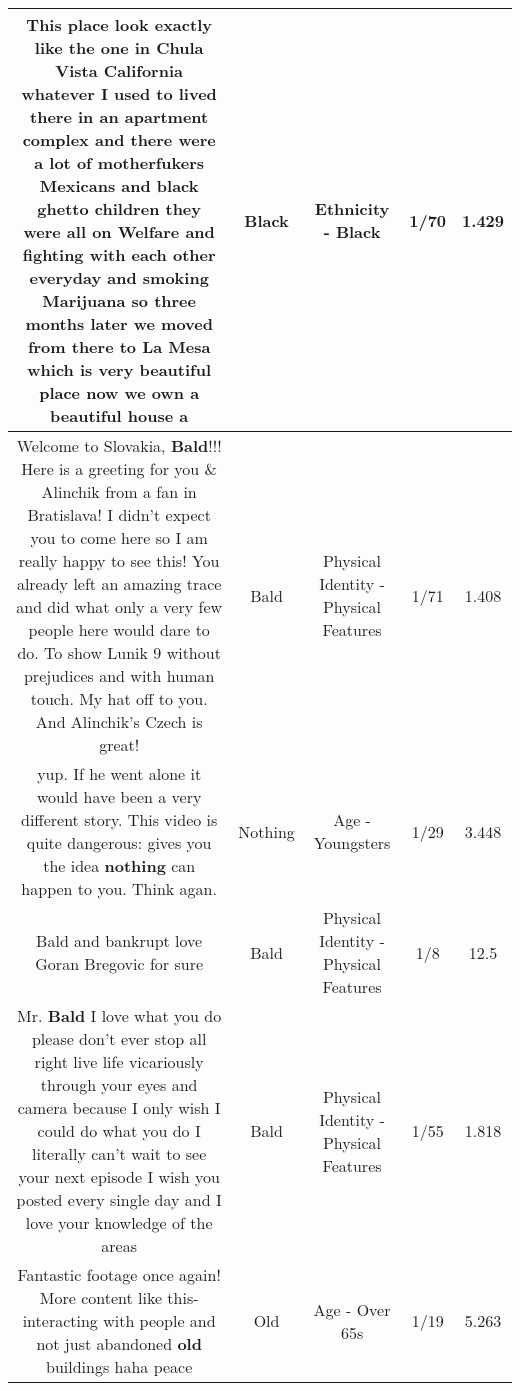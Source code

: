 \documentclass[11pt]{article}
\newlength\mylength
\begin{document}
\begin{center}
\begin{longtable}{|C{.65\mylength}|C{.30\mylength}|C{.12\mylength}|C{.12\mylength}|C{.12\mylength}|}
  \small This place look exactly like the one in Chula Vista California whatever I used to lived there  in an apartment complex and there were a lot of motherfukers  Mexicans and \textbf{black} ghetto children they were all on Welfare and fighting with each other everyday and smoking Marijuana so three months later we moved from there to La Mesa which is  very beautiful place now we own a beautiful house  a\normalsize   & Black & Ethnicity - Black & 1/70 & 1.429 \\  \hline
  \small Welcome to Slovakia, \textbf{Bald}!!! Here is a greeting for you \& Alinchik from a fan in Bratislava! I didn't expect you to come here so I am really happy to see this! You already left an amazing trace and did what only a very few people here would dare to do. To show Lunik 9 without prejudices and with human touch. My hat off to you. And Alinchik's Czech is great!\normalsize   & Bald & Physical Identity - Physical Features & 1/71 & 1.408 \\  \hline
  \small yup. If he went alone it would have been a very different story. This video is quite dangerous: gives you the idea \textbf{nothing} can happen to you. Think agan.\normalsize   & Nothing & Age - Youngsters & 1/29 & 3.448 \\  \hline
  \small Bald and bankrupt love Goran Bregovic for sure\normalsize   & Bald & Physical Identity - Physical Features & 1/8 & 12.5 \\  \hline
  \small Mr. \textbf{Bald} I love what you do please don't ever stop all right live life vicariously through your eyes and camera because I only wish I could do what you do I literally can't wait to see your next episode I wish you posted every single day and I love your knowledge of the areas\normalsize   & Bald & Physical Identity - Physical Features & 1/55 & 1.818 \\  \hline
  \small Fantastic footage once again! More content like this- interacting with people and not just abandoned \textbf{old} buildings haha peace\normalsize   & Old & Age - Over 65s & 1/19 & 5.263 \\  \hline

\end{longtable}
\end{center}
\end{document}
